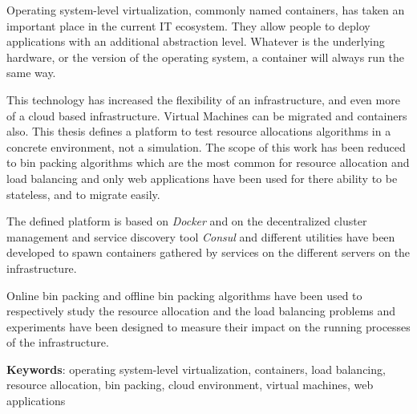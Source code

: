 Operating system-level virtualization, commonly named containers, has taken an
important place in the current IT ecosystem.  They allow people to deploy
applications with an additional abstraction level. Whatever is the underlying
hardware, or the version of the operating system, a container will always run
the same way.

This technology has increased the flexibility of an infrastructure, and even
more of a cloud based infrastructure. Virtual Machines can be migrated and
containers also. This thesis defines a platform to test resource allocations
algorithms in a concrete environment, not a simulation. The scope of this work
has been reduced to bin packing algorithms which are the most common for
resource allocation and load balancing and only web applications have been used
for there ability to be stateless, and to migrate easily.

The defined platform is based on \textit{Docker} and on the decentralized
cluster management and service discovery tool \textit{Consul} and different
utilities have been developed to spawn containers gathered by services on the
different servers on the infrastructure.

Online bin packing and offline bin packing algorithms have been used to
respectively study the resource allocation and the load balancing problems
and experiments have been designed to measure their impact on the running
processes of the infrastructure.

\vspace{2em}
\textbf{Keywords}: operating system-level virtualization, containers, load
balancing, resource allocation, bin packing, cloud environment, virtual
machines, web applications

